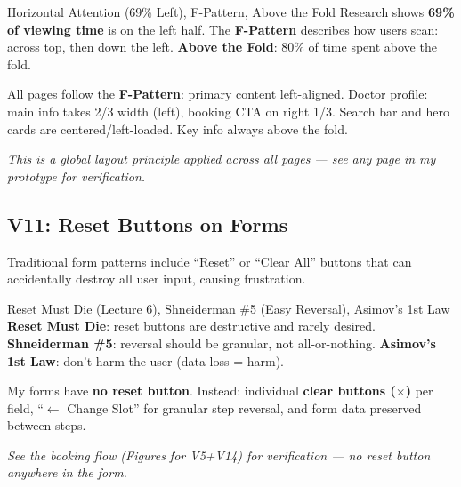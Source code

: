 \documentclass[12pt, a4paper]{article}
\begin{document}
\begin{hcibox}{Horizontal Attention (69\% Left), F-Pattern, Above the Fold}
Research shows \textbf{69\% of viewing time} is on the left half. The \textbf{F-Pattern} describes how users scan: across top, then down the left. \textbf{Above the Fold}: 80\% of time spent above the fold.
\end{hcibox}

\begin{solutionbox}
All pages follow the \textbf{F-Pattern}: primary content left-aligned. Doctor profile: main info takes 2/3 width (left), booking CTA on right 1/3. Search bar and hero cards are centered/left-loaded. Key info always above the fold.

\textit{This is a global layout principle applied across all pages --- see any page in my prototype for verification.}
\end{solutionbox}

\newpage

\subsection{V11: Reset Buttons on Forms}

\begin{violationbox}
Traditional form patterns include ``Reset'' or ``Clear All'' buttons that can accidentally destroy all user input, causing frustration.
\end{violationbox}

\begin{hcibox}{Reset Must Die (Lecture 6), Shneiderman \#5 (Easy Reversal), Asimov's 1st Law}
\textbf{Reset Must Die}: reset buttons are destructive and rarely desired. \textbf{Shneiderman \#5}: reversal should be granular, not all-or-nothing. \textbf{Asimov's 1st Law}: don't harm the user (data loss = harm).
\end{hcibox}

\begin{solutionbox}
My forms have \textbf{no reset button}. Instead: individual \textbf{clear buttons ($\times$)} per field, ``$\leftarrow$ Change Slot'' for granular step reversal, and form data preserved between steps.

\textit{See the booking flow (Figures for V5+V14) for verification --- no reset button anywhere in the form.}
\end{solutionbox}
\end{document}
